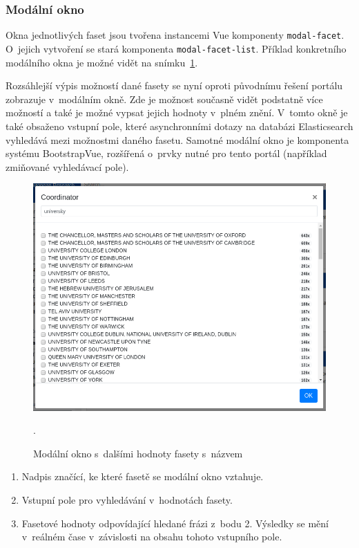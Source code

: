 \subsubsection*{Modální okno}
Okna jednotlivých faset jsou tvořena instancemi Vue komponenty \texttt{modal-facet}. O~jejich vytvoření se stará komponenta \texttt{modal-facet-list}. Příklad konkretního modálního okna je možné vidět na snímku~\ref{img:modal}.

Rozsáhlejší výpis možností dané fasety se nyní oproti původnímu řešení portálu zobrazuje v~modálním okně. Zde je možnost současně vidět podstatně více možností a také je možné vypsat jejich hodnoty v~plném znění. V~tomto okně je také obsaženo vstupní pole, které asynchronními dotazy na databázi Elasticsearch vyhledává mezi možnostmi daného fasetu. Samotné modální okno je komponenta systému BootstrapVue, rozšířená o~prvky nutné pro tento portál (například zmiňované vyhledávací pole).

\begin{figure}[H]
	\centering
	\includegraphics[width=\textwidth]{obrazky-figures/my-modal.png}
	\caption{Modální okno s~dalšími hodnoty fasety s~názvem }.
	\label{img:modal}
\end{figure}
\begin{enumerate}
    \item Nadpis značící, ke které fasetě se modální okno vztahuje.
    \item Vstupní pole pro vyhledávání v~hodnotách fasety.
    \item Fasetové hodnoty odpovídající hledané frázi z~bodu 2. Výsledky se mění v~reálném čase v~závislosti na obsahu tohoto vstupního pole.
\end{enumerate}

